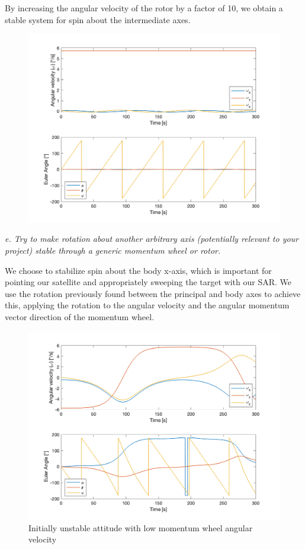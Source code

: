 By increasing the angular velocity of the rotor by a factor of 10, we obtain a stable system for spin about the intermediate axes.

\begin{figure}[H]
\centering
\includegraphics[scale=0.6]{Images/ps4_problem3d.png}
\caption{}
\label{fig:ps4_problem3d.png}
\end{figure}

\newpage
\textit{e. Try to make rotation about another arbitrary axis (potentially relevant to your project) stable through a generic momentum wheel or rotor.}

We choose to stabilize spin about the body x-axis, which is important for pointing our satellite and appropriately sweeping the target with our SAR. We use the rotation previously found between the principal and body axes to achieve this, applying the rotation to the angular velocity and the angular momentum vector direction of the momentum wheel.

\begin{figure}[H]
\centering
\includegraphics[scale=0.6]{Images/ps4_problem3e_unstable.png}
\caption{Initially unstable attitude with low momentum wheel angular velocity}
\label{fig:ps4_problem3e_unstable.png}
\end{figure}

